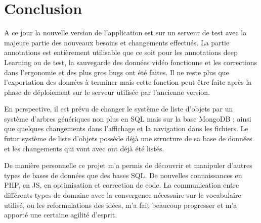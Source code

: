 \documentclass[12pt]{article}
\begin{document}
\section{Conclusion}
A ce jour la nouvelle version de l’application est sur un serveur de test avec la majeure partie des nouveaux besoins et changements effectués. La partie annotations est entièrement utilisable que ce soit pour les annotations deep Learning ou de test, la sauvegarde des données vidéo fonctionne et les corrections dans l’ergonomie et des plus gros bugs ont été faites. Il ne reste plus que l’exportation des données à terminer mais cette fonction peut être faite après la phase de déploiement sur le serveur utilisée par l’ancienne version.
\par
En perspective, il est prévu de changer le système de liste d’objets par un système d’arbres génériques non plus en SQL mais sur la base MongoDB ; ainsi que quelques changements dans l’affichage et la navigation dans les fichiers.
Le futur système de liste d’objets possède déjà une structure de sa base de données et les changements qui vont avec ont déjà été listés.
\par
De manière personnelle ce projet m’a permis de découvrir et manipuler d’autres types de bases de données que des bases SQL. De nouvelles connaissances en PHP, en JS, en optimisation et correction de code. La communication entre différents types de domaine avec la convergence nécessaire sur le vocabulaire utilisé, ou les reformulations des idées, m'a fait beaucoup progresser et m'a apporté une certaine agilité d'esprit.








%
%
\end{document}
